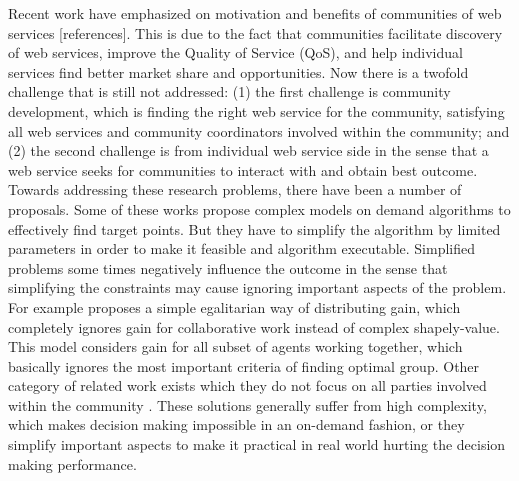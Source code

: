 \documentclass[10pt,journal,cspaper,compsoc]{IEEEtran}
\begin{document}
Recent work have emphasized on motivation and benefits of communities of web services [references]. This is due to the fact that communities facilitate discovery of web services, improve the Quality of Service (QoS), and help individual services find better market share and opportunities. Now there is a twofold challenge that is still not addressed: (1) the first challenge is community development, which is finding the right web service for the community, satisfying all web services and community coordinators involved within the community; and (2) the second challenge is from individual web service side in the sense that a web service seeks for communities to interact with and obtain best outcome. Towards addressing these research problems, there have been a number of proposals. Some of these works propose complex models on demand algorithms \cite{DBLP:conf/IEEEscc/LimTMB12, 10.1109/TSC.2012.12, 10.1109/TSC.2014.2312940} to effectively find target points. But they have to simplify the algorithm by limited parameters in order to make it feasible and algorithm executable. Simplified problems some times negatively influence the outcome in the sense that simplifying the constraints may cause ignoring important aspects of the problem. For example \cite{10.1109/TSC.2012.12} proposes a simple egalitarian way of distributing gain, which completely ignores gain for collaborative work instead of complex shapely-value. This model considers gain for all subset of agents working together, which basically ignores the most important criteria of finding optimal group. Other category of related work exists which they do not focus on all parties involved within the community \cite{DBLP:conf/IEEEscc/KhosravifarABT11}. 
These solutions generally suffer from high complexity, which makes decision making impossible in an on-demand fashion, or they simplify important aspects to make it practical in real world hurting the decision making performance. 
\end{document}
